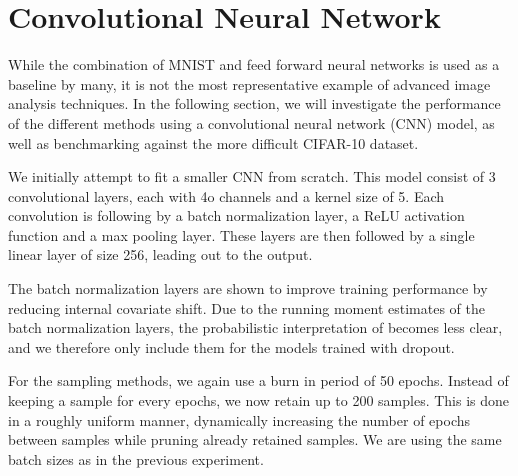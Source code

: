 \FloatBarrier
\section{Convolutional Neural Network}

While the combination of MNIST and feed forward neural networks is used as a baseline by many, it is not the most representative example of advanced image analysis techniques.
In the following section, we will investigate the performance of the different methods using a convolutional neural network (CNN) model, as well as benchmarking against the more difficult CIFAR-10 dataset.

We initially attempt to fit a smaller CNN from scratch.
This model consist of 3 convolutional layers, each with 4o channels and a kernel size of 5.
Each convolution is following by a batch normalization layer, a ReLU activation function and a max pooling layer.
These layers are then followed by a single linear layer of size 256, leading out to the output.

The batch normalization layers are shown to improve training performance by reducing internal covariate shift.
Due to the running moment estimates of the batch normalization layers, the probabilistic interpretation of becomes less clear, and we therefore only include them for the models trained with dropout. 

For the sampling methods, we again use a burn in period of 50 epochs.
Instead of keeping a sample for every epochs, we now retain up to 200 samples.
This is done in a roughly uniform manner, dynamically increasing the number of epochs between samples while pruning already retained samples.
We are using the same batch sizes as in the previous experiment.


